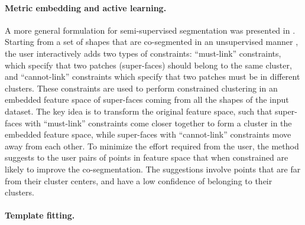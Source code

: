 \paragraph*{Metric embedding and active learning.} A more general formulation for semi-supervised segmentation was presented in \cite{Wang:2012:ACS}.
Starting from a set of shapes that are co-segmented in an unsupervised manner \cite{Sidi:2011:CS}, the user interactively adds two types of constraints: ``must-link'' constraints, which specify that two patches (super-faces) should belong to the same cluster, and ``cannot-link'' constraints which specify that two patches  must be in different clusters. These constraints are used to perform constrained clustering in an embedded feature space of super-faces coming from all the shapes of the input dataset. The key idea is to transform the original feature space, such that super-faces with ``must-link'' constraints come closer together to form a cluster in the embedded feature space, while super-faces with ``cannot-link'' constraints move away from each other. To minimize the effort required from the user, the method suggests to the user pairs of points in feature space that when constrained are likely to improve the co-segmentation.  The suggestions involve points that are far from their cluster centers, and have a low confidence of belonging to their clusters. 

\paragraph*{Template fitting.} 


